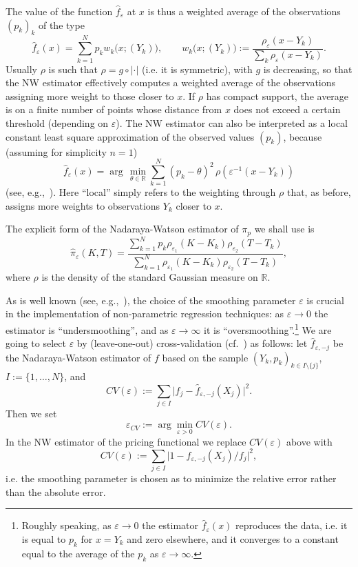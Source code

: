 \documentclass[11pt]{article}
\theoremstyle{remark}
\newcommand{\erre}{\mathbb{R}}
\newcommand{\ds}{\displaystyle}
\begin{document}
The value of the function $\hat{f}_\varepsilon$ at $x$ is thus a
weighted average of the observations $(p_k)_k$ of the type
\[
\hat{f}_\varepsilon(x) = \sum_{k=1}^N p_k w_k\bigl(x;(Y_k)\bigr),
\qquad w_k\bigl(x;(Y_k)\bigr) := \frac{\rho_\varepsilon(x-Y_k)}%
{\sum_k \rho_\varepsilon(x-Y_k)}.
\]
Usually $\rho$ is such that $\rho = g \circ \lvert\cdot\rvert$
(i.e. it is symmetric), with $g$ is decreasing, so that the NW
estimator effectively computes a weighted average of the observations
assigning more weight to those closer to $x$. If $\rho$ has compact
support, the average is on a finite number of points whose distance
from $x$ does not exceed a certain threshold (depending on
$\varepsilon$). The NW estimator can also be interpreted as a local
constant least square approximation of the observed values $(p_k)$,
because (assuming for simplicity $n=1$)
\[
\hat{f}_\varepsilon(x) = \arg\,\min_{\theta\in\erre} 
\sum_{k=1}^N (p_k-\theta)^2 \, \rho(\varepsilon^{-1}(x-Y_k))
\]
(see, e.g.,~\cite[p.~34]{Tsybakov}). Here ``local'' simply refers to the
weighting through $\rho$ that, as before, assigns more weights to
observations $Y_k$ closer to $x$.

\medskip

The explicit form of the Nadaraya-Watson estimator of $\pi_p$ we shall use
is
\[
\hat{\pi}_\varepsilon(K,T) = 
\frac{\ds \sum_{k=1}^N p_k \rho_{\varepsilon_1}(K-K_k) \rho_{\varepsilon_2}(T-T_k)}%
     {\ds \sum_{k=1}^N \rho_{\varepsilon_1}(K-K_k) \rho_{\varepsilon_2}(T-T_k)},
\]
where $\rho$ is the density of the standard Gaussian measure on $\erre$.

\medskip

As is well known (see, e.g.,~\cite{Tsybakov}), the choice of the
smoothing parameter $\varepsilon$ is crucial in the implementation of
non-parametric regression techniques: as $\varepsilon \to 0$ the
estimator is ``undersmoothing'', and as $\varepsilon \to \infty$ it is
``oversmoothing''.\footnote{Roughly speaking, as $\varepsilon \to 0$
  the estimator $\hat{f}_\varepsilon(x)$ reproduces the data, i.e. it
  is equal to $p_k$ for $x=Y_k$ and zero elsewhere, and it converges
  to a constant equal to the average of the $p_k$ as $\varepsilon \to
  \infty$.} We are going to select $\varepsilon$ by (leave-one-out)
cross-validation (cf.~\cite[{\S}1.4, p.~27-ff.]{Tsybakov}) as
follows: let $\hat{f}_{\varepsilon,-j}$ be the Nadaraya-Watson
estimator of $f$ based on the sample $(Y_k,p_k)_{k \in
  I\setminus\{j\}}$, $I:=\{1,\ldots,N\}$, and
\[
CV(\varepsilon) := 
\sum_{j \in I} \big\lvert f_j - \hat{f}_{\varepsilon,-j}(X_j) \big\rvert^2.
\]
Then we set
\[
\varepsilon_{CV} := \arg\min_{\varepsilon>0} CV(\varepsilon).
\]
In the NW estimator of the pricing functional we replace
$CV(\varepsilon)$ above with
\[
CV(\varepsilon) := 
\sum_{j \in I} \big\lvert 1 - \hat{f}_{\varepsilon,-j}(X_j)/f_j \big\rvert^2,
\]
i.e. the smoothing parameter is chosen as to minimize the relative
error rather than the absolute error.
\end{document}
